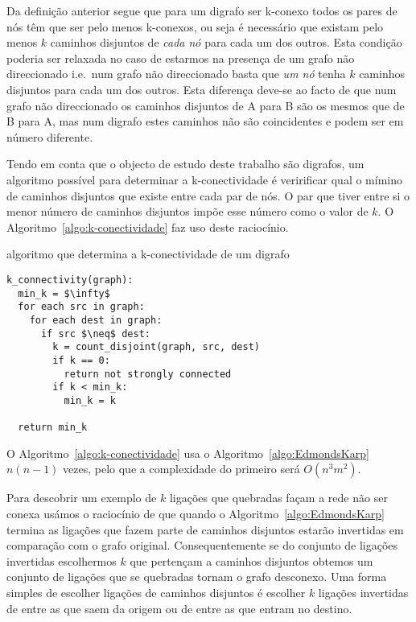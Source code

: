 \documentclass[10pt,a4paper]{article}
\begin{document}
Da definição anterior segue que para um digrafo ser k-conexo todos os pares de nós têm que ser pelo menos k-conexos, ou seja é necessário que existam pelo menos $k$ caminhos disjuntos de \emph{cada nó} para cada um dos outros. Esta condição poderia ser relaxada no caso de estarmos na presença de um grafo não direccionado i.e.\ num grafo não direccionado basta que \emph{um nó} tenha $k$ caminhos disjuntos para cada um dos outros. Esta diferença deve-se ao facto de que num grafo não direccionado os caminhos disjuntos de A para B são os mesmos que de B para A, mas num digrafo estes caminhos não são coincidentes e podem ser em número diferente.

Tendo em conta que o objecto de estudo deste trabalho são digrafos, um algoritmo possível para determinar a k-conectividade é veririficar qual o mímino de caminhos disjuntos que existe entre cada par de nós. O par que tiver entre si o menor número de caminhos disjuntos impõe esse número como o valor de $k$. O Algoritmo~\ref{algo:k-conectividade} faz uso deste raciocínio.

\begin{algorithm}[h]
\caption{algoritmo que determina a k-conectividade de um digrafo}
\label{algo:k-conectividade}
\begin{lstlisting}[linewidth=0.95\linewidth, mathescape]
k_connectivity(graph):
  min_k = $\infty$
  for each src in graph:
    for each dest in graph:
      if src $\neq$ dest:
        k = count_disjoint(graph, src, dest)
        if k == 0:
          return not strongly connected
        if k < min_k:
          min_k = k

  return min_k
\end{lstlisting}
\end{algorithm}

O Algoritmo~\ref{algo:k-conectividade} usa o Algoritmo~\ref{algo:EdmondsKarp} $n(n-1)$ vezes, pelo que a complexidade do primeiro será $O(n^3 m^2)$.

Para descobrir um exemplo de $k$ ligações que quebradas façam a rede não ser conexa usámos o raciocínio de que quando o Algoritmo~\ref{algo:EdmondsKarp} termina as ligações que fazem parte de caminhos disjuntos estarão invertidas em comparação com o grafo original. Consequentemente se do conjunto de ligações invertidas escolhermos $k$ que pertençam a caminhos disjuntos obtemos um conjunto de ligações que se quebradas tornam o grafo desconexo. Uma forma simples de escolher ligações de caminhos disjuntos é escolher $k$ ligações invertidas de entre as que saem da origem ou de entre as que entram no destino.
\end{document}
